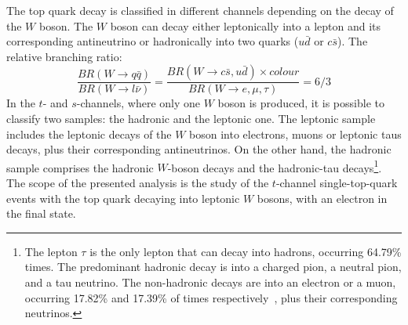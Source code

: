 The top quark decay is classified in different channels depending on the decay of the $W$ boson. The $W$ boson can decay either leptonically into a lepton and its corresponding antineutrino or hadronically into two quarks ($u\bar{d}$ or $c\bar{s}$). The relative branching ratio:
\begin{equation}
\frac{BR(W\rightarrow q\bar{q})}{BR(W\rightarrow l \bar{\nu})}=\frac{BR(W \rightarrow c\bar{s},u\bar{d})\times colour}{BR(W \rightarrow e,\mu,\tau)}=6/3
\end{equation}
In the $t$- and $s$-channels, where only one $W$ boson is produced, it is possible to classify two samples: the hadronic and the leptonic one. The leptonic sample includes the leptonic decays of the $W$ boson into electrons, muons or leptonic taus decays, plus their corresponding antineutrinos. On the other hand, the hadronic sample comprises the hadronic $W$-boson decays and the hadronic-tau decays\footnote{The lepton $\tau$ is the only lepton that can decay into hadrons, occurring 64.79\% times. The predominant hadronic decay is into a charged pion, a neutral pion, and a tau neutrino. The non-hadronic decays are into an electron or a muon, occurring 17.82\% and 17.39\% of times respectively~\cite{Olive:2016xmw}, plus their corresponding neutrinos.}.
The scope of the presented analysis is the study of the $t$-channel single-top-quark events with the top quark decaying into leptonic $W$ bosons, with an electron in the final state.

